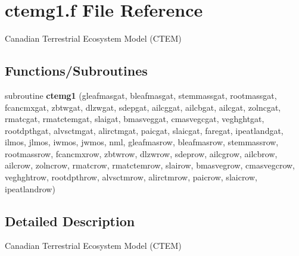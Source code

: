 \hypertarget{ctemg1_8f}{}\section{ctemg1.\+f File Reference}
\label{ctemg1_8f}


Canadian Terrestrial Ecosystem Model (C\+T\+E\+M)  


\subsection*{Functions/\+Subroutines}
\begin{DoxyCompactItemize}
\item 
\hypertarget{ctemg1_8f_a36d37aa08b7676a5697c923064d48653}{}subroutine {\bfseries ctemg1} (gleafmasgat, bleafmasgat, stemmassgat, rootmassgat, fcancmxgat, zbtwgat, dlzwgat, sdepgat, ailcggat, ailcbgat, ailcgat, zolncgat, rmatcgat, rmatctemgat, slaigat, bmasveggat, cmasvegcgat, veghghtgat, rootdpthgat, alvsctmgat, alirctmgat, paicgat, slaicgat, faregat, ipeatlandgat, ilmos, jlmos, iwmos, jwmos, nml, gleafmasrow, bleafmasrow, stemmassrow, rootmassrow, fcancmxrow, zbtwrow, dlzwrow, sdeprow, ailcgrow, ailcbrow, ailcrow, zolncrow, rmatcrow, rmatctemrow, slairow, bmasvegrow, cmasvegcrow, veghghtrow, rootdpthrow, alvsctmrow, alirctmrow, paicrow, slaicrow, ipeatlandrow)\label{ctemg1_8f_a36d37aa08b7676a5697c923064d48653}

\end{DoxyCompactItemize}


\subsection{Detailed Description}
Canadian Terrestrial Ecosystem Model (C\+T\+E\+M) 

